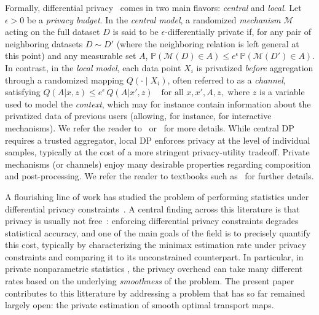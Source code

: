 \documentclass{article}
\newcommand{\1}{\mathds{1}}
\theoremstyle{plain}
\theoremstyle{definition}
\theoremstyle{remark}
\begin{document}
Formally, differential privacy~\cite{dwork2014algorithmic} comes in two main flavors: \emph{central} and \emph{local}. Let $\epsilon > 0$ be a \emph{privacy budget}.
In the \emph{central model}, a randomized \emph{mechanism} $\mathcal{M}$ acting on the full dataset $D$ is said to be $\epsilon$-differentially private if, for any pair of neighboring datasets $D \sim D'$ (where the neighboring relation is left general at this point) and any measurable set $A$,
$
\mathbb{P}\left(\mathcal{M}(D)\in A\right) \le e^{\epsilon}\, \mathbb{P}\left(\mathcal{M}(D')\in A\right).
$
In contrast, in the \emph{local model}, each data point $X_i$ is privatized \emph{before} aggregation through a randomized mapping $Q(\cdot\mid X_i)$, often referred to as a \emph{channel}, satisfying
$
Q(A | x, z) \le e^{\epsilon}\, Q(A | x', z) \quad \text{for all } x, x', A, z,
$
where $z$ is a variable used to model the \emph{context}, which may for instance contain information about the privatized data of previous users (allowing, for instance, for interactive mechanisms). We refer the reader to~\cite{butucea2020local} or~\cite{duchi2013local} for more details.
While central DP requires a trusted aggregator, local DP enforces privacy at the level of individual samples, typically at the cost of a more stringent privacy-utility tradeoff. Private mechanisms (or channels) enjoy many desirable properties regarding composition and post-processing. We refer the reader to textbooks such as~\cite{dwork2014algorithmic} for further details.

A flourishing line of work has studied the problem of performing statistics under differential privacy constraints~\cite{diakonikolas2015differentially,karwa2017finite,bun2019privatehypothesis,bun2021privatehypothesis}. A central finding across this literature is that privacy is usually not free~\cite{kamath2019highdimensional,biswas2020coinpress,kamath2020heavytailed,acharya2021differentially,adenali2021unbounded,brown2021covariance,cai2021cost,kamath2022improved,singhal2023polynomial,kamath2023biasvarianceprivacy,kamath2023new,chhor2023robust,beraha2023mcmc}: enforcing differential privacy constraints degrades statistical accuracy, and one of the main goals of the field is to precisely quantify this cost, typically by characterizing the minimax estimation rate under privacy constraints and comparing it to its unconstrained counterpart. In particular, in private nonparametric statistics \cite{wasserman2010statistical,barber2014privacy,lalanne2023about,lalanne2024privatedensity,10.1145/773153.773174,4690986,duchi2013local,duchi2018minimax,butucea2020local,kroll2021density,schluttenhofer2022adaptive,gyorfi2023multivariate,berrett2021strongly,gyorfi2022rate}, the privacy overhead can take many different rates based on the underlying \emph{smoothness} of the problem.
The present paper contributes to this litterature by addressing a problem that has so far remained largely open: the private estimation of smooth optimal transport maps. 
\end{document}
